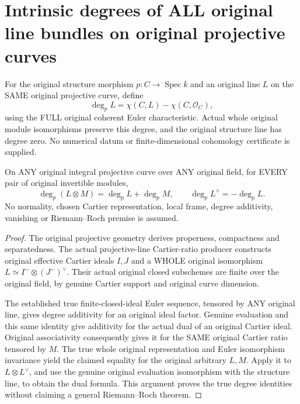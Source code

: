 \section{Intrinsic degrees of ALL original line bundles on original projective curves}

\begin{definition}
\label{def:fc-original-curve-line-degree}
\leanok
{}
For the original structure morphism $p:C\to\operatorname{Spec}k$ and an
original line $L$ on the SAME original projective curve, define
\[
 \deg_p L=\chi(C,L)-\chi(C,\mathcal O_C),
\]
using the FULL original coherent Euler characteristic. Actual whole
original module isomorphisms preserve this degree, and the original
structure line has degree zero. No numerical datum or finite-dimensional
cohomology certificate is supplied.
\end{definition}

\begin{theorem}
\label{thm:fc-original-curve-line-degree-tensor}
\leanok
{}
On ANY original integral projective curve over ANY original field, for
EVERY pair of original invertible modules,
\[
 \deg_p(L\otimes M)=\deg_pL+\deg_pM,
 \qquad \deg_p L^\vee=-\deg_p L.
\]
No normality, chosen Cartier representation, local frame, degree
additivity, vanishing or Riemann--Roch premise is assumed.
\end{theorem}
\begin{proof}
The original projective geometry derives properness, compactness and
separatedness. The actual projective-line Cartier-ratio producer constructs
original effective Cartier ideals $I,J$ and a WHOLE original isomorphism
$L\simeq I^{\sim}\otimes(J^{\sim})^\vee$. Their actual original closed
subschemes are finite over the original field, by genuine Cartier support
and original curve dimension.

The established true finite-closed-ideal Euler sequence, tensored by ANY
original line, gives degree additivity for an original ideal factor.
Genuine evaluation and this same identity give additivity for the actual
dual of an original Cartier ideal. Original associativity consequently
gives it for the SAME original Cartier ratio tensored by $M$. The true
whole original representation and Euler isomorphism invariance yield the
claimed equality for the original arbitrary $L,M$. Apply it to
$L\otimes L^\vee$, and use the genuine original evaluation isomorphism
with the structure line, to obtain the dual formula. This argument proves
the true degree identities without claiming a general Riemann--Roch theorem.
\end{proof}

